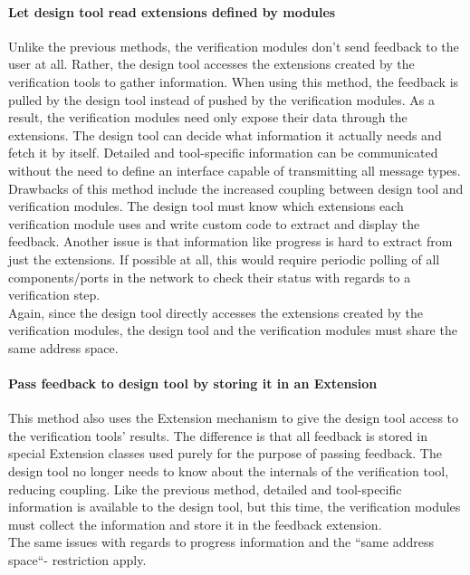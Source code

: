 \documentclass[a4paper,11pt]{article}
\begin{document}
\paragraph{Let design tool read extensions defined by modules}
Unlike the previous methods, the verification modules don't send feedback to
the user at all. Rather, the design tool accesses the extensions created by the
verification  tools to gather information. When using this method, the feedback is
pulled by the design tool instead of pushed by the verification modules. As a result,
the verification modules need only expose their data through the extensions. The
design tool can decide what information it actually needs and fetch it by itself.
Detailed and tool-specific information can be communicated without the need to
define an interface capable of transmitting all message types.\\
Drawbacks of this method include the increased coupling between design tool and
verification modules. The design tool must know which extensions each verification
module uses and write custom code to extract and display the feedback. Another
issue is that information like progress is hard to extract from just the extensions.
If possible at all, this would require periodic polling of all components/ports in the
network to check their status with regards to a verification step.\\
Again, since the design tool directly accesses the extensions created by the verification
modules, the design tool and the verification modules must share the same address space.

\paragraph{Pass feedback to design tool by storing it in an Extension}
This method also uses the Extension mechanism to give the design tool access to the
verification tools' results. The difference is that all feedback is stored in
special Extension classes used purely for the purpose of passing feedback. The design
tool no longer needs to know about the internals of the verification tool, reducing
coupling. Like the previous method, detailed and tool-specific information is
available to the design tool, but this time, the verification modules must collect
the information and store it in the feedback extension.\\
The same issues with regards to progress information and the ``same address space``-
restriction apply.
\end{document}
